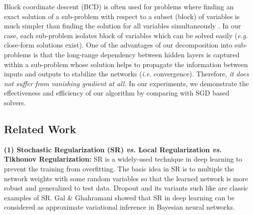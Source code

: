 \documentclass{article}
\def\eg{\emph{e.g. }}
\def\ie{\emph{i.e. }}
\def\vs{\emph{vs. }}
\begin{document}
	Block coordinate descent (BCD) is often used for problems where finding an exact solution of a sub-problem with respect to a subset (block) of variables is much simpler than finding the solution for all variables simultaneously \cite{nesterov2012efficiency}. In our case, each sub-problem isolates block of variables which can be solved easily (\eg close-form solutions exist). %
One of the advantages of our decomposition into sub-problems is that the long-range dependency between hidden layers is captured within a sub-problem whose solution helps to propagate the information between inputs and outputs to stabilize the networks (\ie convergence). Therefore, {\em it does not suffer from vanishing gradient at all.}
	In our experiments, we demonstrate the effectiveness and efficiency of our algorithm by comparing with SGD based solvers.%
	
	
	\subsection{Related Work}{\bf (1) Stochastic Regularization (SR) \vs Local Regularization \vs Tikhonov Regularization:} SR is a widely-used technique in deep learning to prevent the training from overfitting. The basic idea in SR is to multiple the network weights with some random variables so that the learned network is more robust and generalized to test data. Dropout \cite{srivastava2014dropout} and its variants such like \cite{kingma2015variational} are classic examples of SR. Gal \& Ghahramani \cite{gal2015modern} showed that SR in deep learning can be considered as approximate variational inference in Bayesian neural networks.%
	
\end{document}
